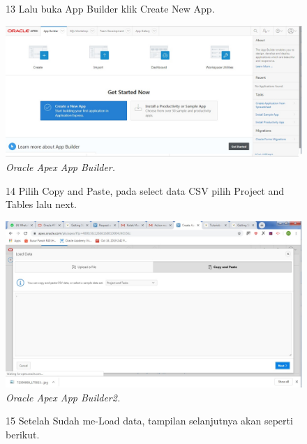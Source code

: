 \begin{enumerate}
\begin{figure}
\item[13] Lalu buka App Builder klik Create New App.

    \begin{center}
\includegraphics[scale=0.4]{figures/login2.jpg}
    \caption{\textit{Oracle Apex App Builder.}}
        \end{center}
\label{gambar}
\end{figure}

\begin{figure}
\item[14] Pilih Copy and Paste, pada select data CSV pilih Project and Tables lalu next.

    \begin{center}
\includegraphics[scale=0.4]{figures/login3.jpg}
    \caption{\textit{Oracle Apex App Builder2.}}
        \end{center}
\label{gambar}
\end{figure}

\begin{figure}
\item[15] Setelah Sudah me-Load data, tampilan selanjutnya akan seperti berikut.


\end{figure}
\end{enumerate}
